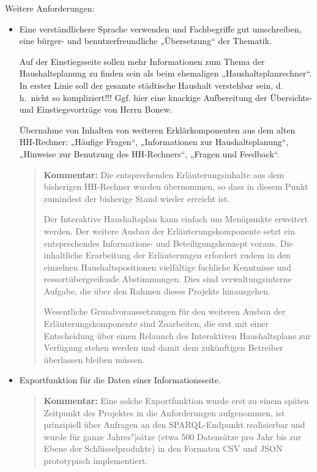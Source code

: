 \documentclass[11pt,a4paper,twoside]{article}
\newcommand{\kommentar}[1]{\begin{quote}\textbf{Kommentar:} #1 \end{quote}}
\begin{document}
Weitere Anforderungen:
\begin{itemize}\itemsep0pt
\item Eine verständlichere Sprache verwenden und Fachbegriffe gut umschreiben,
  eine bürger- und benutzerfreundliche „Übersetzung“ der Thematik.

  Auf der Einstiegsseite sollen mehr Informationen zum Thema der
  Haushaltsplanung zu finden sein als beim ehemaligen „Haushaltsplanrechner“.
  In erster Linie soll der gesamte städtische Haushalt verstehbar sein,
  d.\,h.\ nicht so kompliziert!!! Ggf. hier eine knackige Aufbereitung der
  Übersichts- und Einstiegsvorträge von Herrn Bonew.

  Übernahme von Inhalten von weiteren Erklärkomponenten aus dem alten
  HH-Rechner: „Häufige Fragen“, „Informationen zur Haushaltsplanung“, „Hinweise
  zur Benutzung des HH-Rechners“, „Fragen und Feedback“.

  \kommentar{Die entsprechenden Erläuterungsinhalte aus dem bisherigen
    HH-Rechner wurden übernommen, so dass in diesem Punkt zumindest der
    bisherige Stand wieder erreicht ist.

    Der Interaktive Haushaltsplan kann einfach um Menüpunkte erweitert werden.
    Der weitere Ausbau der Erläuterungskomponente setzt ein entsprechendes
    Informations- und Beteiligungskonzept voraus. Die inhaltliche Erarbeitung
    der Erläuterungen erfordert zudem in den einzelnen Haushaltspositionen
    vielfältige fachliche Kenntnisse und ressortübergreifende Abstimmungen.
    Dies sind verwaltungsinterne Aufgabe, die über den Rahmen dieses Projekts
    hinausgehen.

    Wesentliche Grundvoraussetzungen für den weiteren Ausbau der
    Erläuterungskomponente sind Zuarbeiten, die erst mit einer Entscheidung
    über einen Relaunch des Interaktiven Haushaltsplans zur Verfügung stehen
    werden und damit dem zukünftigen Betreiber überlassen bleiben müssen.}

\item Exportfunktion für die Daten einer Informationsseite.

\kommentar{Eine solche Exportfunktion wurde erst zu einem späten Zeitpunkt des
  Projektes in die Anforderungen aufgenommen, ist prinzipiell über Anfragen an
  den SPARQL-Endpunkt realisierbar und wurde für ganze Jahres"|sätze (etwa 500
  Datensätze pro Jahr bis zur Ebene der Schlüsselprodukte) in den Formaten CSV
  und JSON prototypisch implementiert. }

\end{itemize}
\end{document}
